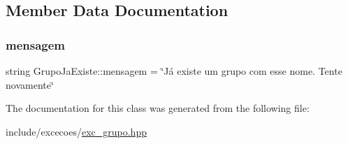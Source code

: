 \subsection{Member Data Documentation}
\mbox{\label{classGrupoJaExiste_aa2438c23067a525e7e1cdbf773b01dba}} 
\subsubsection{\texorpdfstring{mensagem}{mensagem}}
{\footnotesize\ttfamily string Grupo\+Ja\+Existe\+::mensagem = \char`\"{}Já existe um grupo com esse nome. Tente novamente\char`\"{}\hspace{0.3cm}{\ttfamily [private]}}



The documentation for this class was generated from the following file\+:\begin{DoxyCompactItemize}
\item 
include/excecoes/\hyperlink{exc__grupo_8hpp}{exc\+\_\+grupo.\+hpp}\end{DoxyCompactItemize}
